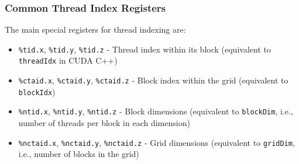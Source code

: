 \subsubsection{Common Thread Index Registers}

The main special registers for thread indexing are:

\begin{itemize}
    \item \texttt{\%tid.x}, \texttt{\%tid.y}, \texttt{\%tid.z} - Thread index within its block (equivalent to \texttt{threadIdx} in CUDA C++)
    
    \item \texttt{\%ctaid.x}, \texttt{\%ctaid.y}, \texttt{\%ctaid.z} - Block index within the grid (equivalent to \texttt{blockIdx})
    
    \item \texttt{\%ntid.x}, \texttt{\%ntid.y}, \texttt{\%ntid.z} - Block dimensions (equivalent to \texttt{blockDim}, i.e., number of threads per block in each dimension)
    
    \item \texttt{\%nctaid.x}, \texttt{\%nctaid.y}, \texttt{\%nctaid.z} - Grid dimensions (equivalent to \texttt{gridDim}, i.e., number of blocks in the grid)
\end{itemize}

